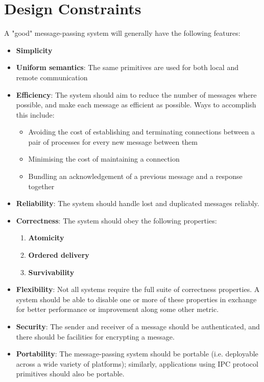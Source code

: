 \section{Design Constraints}
A "good" message-passing system will generally have the following features:
\begin{itemize}
\item \textbf{Simplicity}
\item \textbf{Uniform semantics}: The same primitives are used for both local and remote communication
\item \textbf{Efficiency}: The system should aim to reduce the number of messages where possible, and make each message as efficient as possible. Ways to accomplish this include: \begin{itemize}
	\item Avoiding the cost of establishing and terminating connections between a pair of processes for every new message between them
	\item Minimising the cost of maintaining a connection
	\item Bundling an acknowledgement of a previous message and a response together
\end{itemize}
\item \textbf{Reliability}: The system should handle lost and duplicated messages reliably.
\item \textbf{Correctness}: The system should obey the following properties: \begin{enumerate}
	\item \textbf{Atomicity}
	\item \textbf{Ordered delivery}
	\item \textbf{Survivability}
\end{enumerate}
\item \textbf{Flexibility}: Not all systems require the full suite of correctness properties. A system should be able to disable one or more of these properties in exchange for better performance or improvement along some other metric.
\item \textbf{Security}: The sender and receiver of a message should be authenticated, and there should be facilities for encrypting a message.
\item \textbf{Portability}: The message-passing system should be portable (i.e. deployable across a wide variety of platforms); similarly, applications using IPC protocol primitives should also be portable.
\end{itemize}

